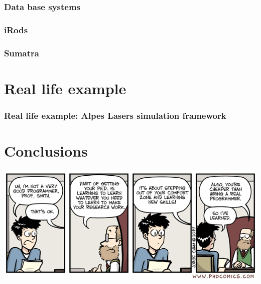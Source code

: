 \documentclass[14pt]{beamer}
\begin{document}
\begin{frame}
\frametitle{Data base systems}
\end{frame}

\begin{frame}
\frametitle{iRods}
\end{frame}

\begin{frame}
\frametitle{Sumatra}
\end{frame}

\section{Real life example}
\begin{frame}
\frametitle{Real life example: Alpes Lasers simulation framework}
\end{frame}

\section{Conclusions}
\begin{frame}
\includegraphics[width=\textwidth]{sad_truth}
\end{frame}
\end{document}
